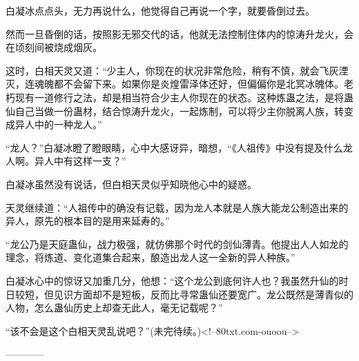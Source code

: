 \begin{this_body}
白凝冰点点头，无力再说什么，他觉得自己再说一个字，就要昏倒过去。

然而一旦昏倒的话，按照影无邪交代的话，他就无法控制住体内的惊涛升龙火，会在顷刻间被烧成烟灰。

这时，白相天灵又道：“少主人，你现在的状况非常危险，稍有不慎，就会飞灰湮灭，连魂魄都不会留下来。如果你是炎煌雷泽体还好，但偏偏你是北冥冰魄体。老朽现有一道修行之法，却是相当符合少主人你现在的状态。这种炼蛊之法，是将蛊仙自己当做一份蛊材，结合惊涛升龙火，一起炼制，可以将少主你脱离人族，转变成异人中的一种龙人。”

“龙人？”白凝冰瞪了瞪眼睛，心中大感讶异，暗想，“《人祖传》中没有提及什么龙人啊。异人中有这样一支？”

白凝冰虽然没有说话，但白相天灵似乎知晓他心中的疑惑。

天灵继续道：“人祖传中的确没有记载，因为龙人本就是人族大能龙公制造出来的异人，原先的根本目的是用来延寿的。”

“龙公乃是天庭蛊仙，战力极强，就仿佛那个时代的剑仙薄青。他提出人人如龙的理念，将炼道、变化道集合起来，酿造出龙人这一全新的异人种族。”

白凝冰心中的惊讶又加重几分，他想：“这个龙公到底何许人也？我虽然升仙的时日较短，但见识方面却不是短板，反而比寻常蛊仙还要宽广。龙公既然是薄青似的人物，怎么蛊仙历史上却查无此人，毫无记载呢？”

“该不会是这个白相天灵乱说吧？”(未完待续。)<!--80txt.com-ouoou-->

------------

\end{this_body}

